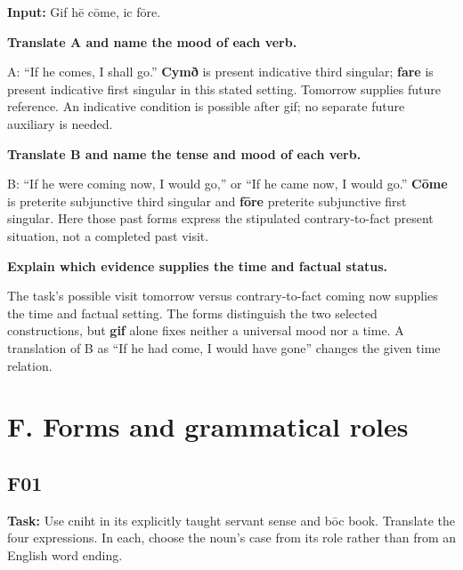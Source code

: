 \textbf{Input:} Gif hē cōme, ic fōre.

\textbf{Translate A and name the mood of each verb.}

A: “If he comes, I shall go.” \textbf{Cymð} is present indicative third singular; \textbf{fare} is present indicative first singular in this stated setting. Tomorrow supplies future reference. An indicative condition is possible after gif; no separate future auxiliary is needed.

\textbf{Translate B and name the tense and mood of each verb.}

B: “If he were coming now, I would go,” or “If he came now, I would go.” \textbf{Cōme} is preterite subjunctive third singular and \textbf{fōre} preterite subjunctive first singular. Here those past forms express the stipulated contrary-to-fact present situation, not a completed past visit.

\textbf{Explain which evidence supplies the time and factual status.}

The task's possible visit tomorrow versus contrary-to-fact coming now supplies the time and factual setting. The forms distinguish the two selected constructions, but \textbf{gif} alone fixes neither a universal mood nor a time. A translation of B as “If he had come, I would have gone” changes the given time relation.

\section*{F. Forms and grammatical roles}

\subsection*{F01}

\textbf{Task:} Use cniht in its explicitly taught servant sense and bōc book. Translate the four expressions. In each, choose the noun's case from its role rather than from an English word ending.

